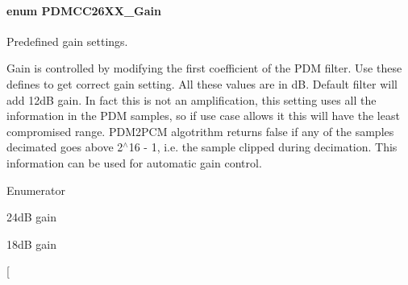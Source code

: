 \paragraph[{P\+D\+M\+C\+C26\+X\+X\+\_\+\+Gain}]{\setlength{\rightskip}{0pt plus 5cm}enum {\bf P\+D\+M\+C\+C26\+X\+X\+\_\+\+Gain}}\label{_p_d_m_c_c26_x_x_8h_a8c2d67aee547a2c8228465034ae0267f}


Predefined gain settings. 

Gain is controlled by modifying the first coefficient of the P\+D\+M filter. Use these defines to get correct gain setting. All these values are in d\+B. Default filter will add 12d\+B gain. In fact this is not an amplification, this setting uses all the information in the P\+D\+M samples, so if use case allows it this will have the least compromised range. P\+D\+M2\+P\+C\+M algotrithm returns false if any of the samples decimated goes above 2$^\wedge$16 -\/ 1, i.\+e. the sample clipped during decimation. This information can be used for automatic gain control. \begin{Desc}
\item[Enumerator]\par
\begin{description}
\item[{\em 
P\+D\+M\+C\+C26\+X\+X\+\_\+\+G\+A\+I\+N\+\_\+24\label{_p_d_m_c_c26_x_x_8h_a8c2d67aee547a2c8228465034ae0267fad32df2e2c24bdb0d67c3ec63c0c46178}
}]24d\+B gain \item[{\em 
P\+D\+M\+C\+C26\+X\+X\+\_\+\+G\+A\+I\+N\+\_\+18\label{_p_d_m_c_c26_x_x_8h_a8c2d67aee547a2c8228465034ae0267fa332b4d0aeb82669190f2b2bcfa9ea6c8}
}]18d\+B gain \item[{\em 
}
\end{description}
\end{Desc}
